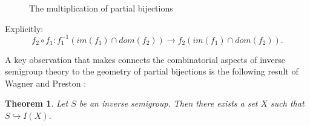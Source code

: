 \documentclass[11pt,]{amsbook}
\theoremstyle{plain}
\newtheorem{theorem}{Theorem}%
\theoremstyle{definition}%
\theoremstyle{remark}%
\begin{document}
\begin{figure}[h]
\begin{center}

\def\firstcircle{(-0.25,-1.25) circle (1.0cm)}
\def\secondcircle{(-0.25,0) circle (1.0cm)}
\def\thirdcircle{(-4.75,0) circle (1.0cm)}
\def\forthcircle{(-4.75,-2.5) circle (1.0cm)}
\def\fifthcircle{(-4.75,-1.25) circle (1.0cm)}

    
\setlength{\parskip}{5mm}

\caption{The multiplication of partial bijections}
\label{Fig:Comp}
\end{center}
\end{figure}
Explicitly:
\begin{equation*}
f_{2}\circ f_{1}: f_{1}^{-1}(im(f_{1})\cap dom(f_{2})) \rightarrow f_{2}(im(f_{1})\cap dom(f_{2})).
\end{equation*}

A key observation that makes connects the combinatorial aspects of inverse semigroup theory to the geometry of partial bijections is the following result of Wagner and Preston \cite{MR1455373}:

\begin{theorem}\label{Thm:WP}
Let $S$ be an inverse semigroup. Then there exists a set $X$ such that $S \hookrightarrow I(X)$.
\end{theorem}
\end{document}
